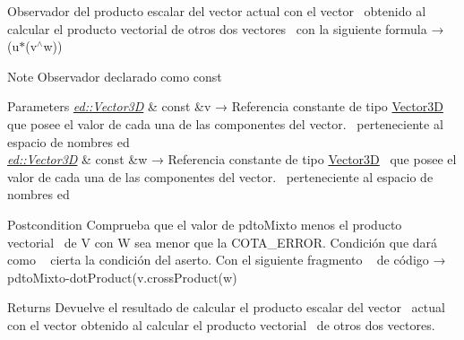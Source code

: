 Observador del producto escalar del vector actual con el vector~\newline
 obtenido al calcular el producto vectorial de otros dos vectores~\newline
 con la siguiente formula → (u$\ast$(v$^\wedge$w)) 

\begin{DoxyNote}{Note}
Observador declarado como const
\end{DoxyNote}

\begin{DoxyParams}{Parameters}
{\em \mbox{\hyperlink{classed_1_1Vector3D}{ed\+::\+Vector3D}}} & const \&v → Referencia constante de tipo \mbox{\hyperlink{classed_1_1Vector3D}{Vector3D}}~\newline
 que posee el valor de cada una de las componentes del vector.~\newline
 perteneciente al espacio de nombres ed\\
\hline
{\em \mbox{\hyperlink{classed_1_1Vector3D}{ed\+::\+Vector3D}}} & const \&w → Referencia constante de tipo \mbox{\hyperlink{classed_1_1Vector3D}{Vector3D}}~\newline
 que posee el valor de cada una de las componentes del vector.~\newline
 perteneciente al espacio de nombres ed\\
\hline
\end{DoxyParams}
\begin{DoxyPostcond}{Postcondition}
Comprueba que el valor de pdto\+Mixto menos el producto vectorial~\newline
 de V con W sea menor que la C\+O\+T\+A\+\_\+\+E\+R\+R\+OR. Condición que dará como ~\newline
 cierta la condición del aserto. Con el siguiente fragmento ~\newline
 de código → pdto\+Mixto-\/dot\+Product(v.\+cross\+Product(w)
\end{DoxyPostcond}
\begin{DoxyReturn}{Returns}
Devuelve el resultado de calcular el producto escalar del vector~\newline
 actual con el vector obtenido al calcular el producto vectorial~\newline
 de otros dos vectores. 
\end{DoxyReturn}
\mbox{\label{classed_1_1Vector3D_acfdf541551fe60c3d01f4415989f20c2}} 
